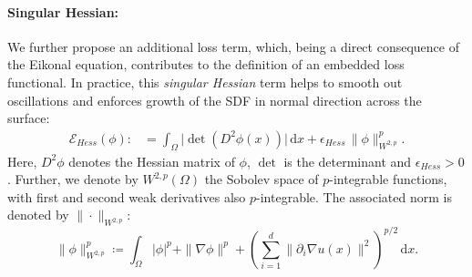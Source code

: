 \documentclass[12pt,openany]{book}
\theoremstyle{plainnormal}
\theoremstyle{remark}
\begin{document}
\paragraph{Singular Hessian:}
We further propose an additional loss term, which, being a direct consequence of the Eikonal equation, contributes to the definition of an embedded loss functional. In practice, this \emph{singular Hessian} term helps to smooth out oscillations and enforces growth of the SDF in normal direction across the surface: 
\begin{align}\label{loss_Hess}
    \mathcal{E}_{Hess}({\phi}) :&=   \int_\Omega \big|\det(D^2 \phi(x))\big| \,\mathrm{d}x + \epsilon_{Hess}\, \|\phi\|_{W^{2,p}}^p  .
\end{align}
Here, $D^2 \phi$ denotes the Hessian matrix of $\phi$, $\det$ is the determinant and $\epsilon_{Hess} > 0$. Further, we denote by \( W^{2,p}(\Omega) \) the Sobolev space of $p$-integrable functions, with first and second weak derivatives also \( p \)-integrable. The associated norm is denoted by \( \|\cdot\|_{W^{2,p}} \): $$\|\phi\|^p_{W^{2,p}} \coloneqq\int_\Omega |\phi|^p + \|\nabla \phi\|^p + \left( \sum_{i=1}^d \| \partial_i \nabla u(x) \|^2 \right)^{p/2} \, \mathrm{d}x.$$
\end{document}
